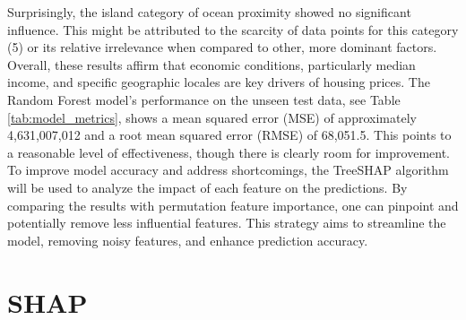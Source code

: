 \documentclass[12pt]{article}
\begin{document}
Surprisingly, the island category of ocean proximity showed no significant influence. This might be attributed to the scarcity of data points for this category (5) or its relative irrelevance when compared to other, more dominant factors. 
Overall, these results affirm that economic conditions, particularly median income, and specific geographic locales are key drivers of housing prices. 
The Random Forest model's performance on the unseen test data, see Table \ref{tab:model_metrics}, shows a mean squared error (MSE) of approximately 4,631,007,012 and a root mean squared error (RMSE) of 68,051.5. This points to a reasonable level of effectiveness, though there is clearly room for improvement.
To improve model accuracy and address shortcomings, the TreeSHAP algorithm will be used to analyze the impact of each feature on the predictions. By comparing the results with permutation feature importance, one can pinpoint and potentially remove less influential features. This strategy aims to streamline the model, removing noisy features, and enhance prediction accuracy.


\section{SHAP}
\end{document}
